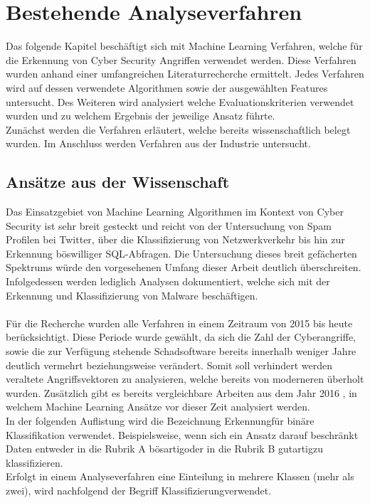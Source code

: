 \documentclass[
    12pt, %
    DIV10,
    ngerman, %
    a4paper, %
    oneside, %
    titlepage, %
    parskip=half, %
    headings=normal, %
    listof=totoc, %
    bibliography=totoc, %
    index=totoc, %
    captions=tableheading, %
    final %
]{scrreprt}
\begin{document}
\chapter{Bestehende Analyseverfahren}
\label{sec:ba}
Das folgende Kapitel beschäftigt sich mit Machine Learning Verfahren, welche für die Erkennung von Cyber Security Angriffen verwendet werden. Diese Verfahren wurden anhand einer umfangreichen Literaturrecherche ermittelt. Jedes Verfahren wird auf dessen verwendete Algorithmen sowie der ausgewählten Features untersucht. Des Weiteren wird analysiert welche Evaluationskriterien verwendet wurden und zu welchem Ergebnis der jeweilige Ansatz führte.\\
Zunächst werden die Verfahren erläutert, welche bereits wissenschaftlich belegt wurden. Im Anschluss werden Verfahren aus der Industrie untersucht.
\section{Ansätze aus der Wissenschaft}
\label{sec:aw}
Das Einsatzgebiet von Machine Learning Algorithmen im Kontext von Cyber Security ist sehr breit gesteckt und reicht von der Untersuchung von Spam Profilen bei Twitter, über die Klassifizierung von Netzwerkverkehr bis hin zur Erkennung böswilliger SQL-Abfragen. Die Untersuchung dieses breit gefächerten Spektrums würde den vorgesehenen Umfang dieser Arbeit deutlich überschreiten. Infolgedessen werden lediglich Analysen dokumentiert, welche sich mit der Erkennung und Klassifizierung von Malware beschäftigen.
\\\\
Für die Recherche wurden alle Verfahren in einem Zeitraum von 2015 bis heute berücksichtigt. Diese Periode wurde gewählt, da sich die Zahl der Cyberangriffe, sowie die zur Verfügung stehende Schadsoftware bereits innerhalb weniger Jahre deutlich vermehrt beziehungsweise verändert. Somit soll verhindert werden veraltete Angriffsvektoren zu analysieren, welche bereits von moderneren überholt wurden. Zusätzlich gibt es bereits vergleichbare Arbeiten aus dem Jahr 2016 \parencite[s.][]{Buczak2016}, in welchem Machine Learning Ansätze vor dieser Zeit analysiert werden.\\
In der folgenden Auflistung wird die Bezeichnung \glqq Erkennung\grqq für binäre Klassifikation verwendet. Beispielsweise, wenn sich ein Ansatz darauf beschränkt Daten entweder in die Rubrik A \glqq bösartig\grqq oder in die Rubrik B \glqq gutartig\grqq zu klassifizieren.\\
Erfolgt in einem Analyseverfahren eine Einteilung in mehrere Klassen (mehr als zwei), wird nachfolgend der Begriff 
\glqq Klassifizierung\grqq verwendet.
\\\\
\end{document}
